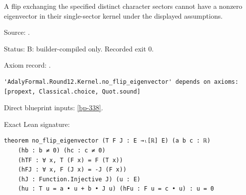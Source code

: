 \begin{theorem}[bp-339]
\label{bp-339}
\leanok
A flip exchanging the specified distinct character sectors cannot have a nonzero eigenvector in their single-sector kernel under the displayed assumptions.

\par Source: \texttt{}.
\par Status: B: builder-compiled only. Recorded exit 0.
\par Axiom record: \texttt{}.
\begin{verbatim}
'AdalyFormal.Round12.Kernel.no_flip_eigenvector' depends on axioms: [propext, Classical.choice, Quot.sound]
\end{verbatim}
\par Direct blueprint inputs: \ref{bp-338}.
\par Exact Lean signature:
\begin{verbatim}
theorem no_flip_eigenvector (T F J : E →ₗ[ℝ] E) (a b c : ℝ)
    (hb : b ≠ 0) (hc : c ≠ 0)
    (hTF : ∀ x, T (F x) = F (T x))
    (hFJ : ∀ x, F (J x) = -J (F x))
    (hJ : Function.Injective J) (u : E)
    (hu : T u = a • u + b • J u) (hFu : F u = c • u) : u = 0
\end{verbatim}
\end{theorem}

